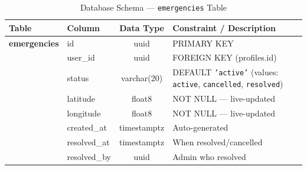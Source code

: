 \documentclass[12pt, a4paper, twoside]{report}
\begin{document}
\begin{table}[ht]
\centering
\caption{Database Schema --- \texttt{emergencies} Table}
\label{tab:emergencies}
\begin{tabularx}{\textwidth}{p{3cm} p{3cm} c X}
\toprule
\textbf{Table} & \textbf{Column} & \textbf{Data Type} & \textbf{Constraint / Description} \\
\midrule
\textbf{emergencies} & id & uuid & PRIMARY KEY \\
& user\_id & uuid & FOREIGN KEY (profiles.id) \\
& status & varchar(20) & DEFAULT \texttt{'active'} (values: \texttt{active}, \texttt{cancelled}, \texttt{resolved}) \\
& latitude & float8 & NOT NULL --- live-updated \\
& longitude & float8 & NOT NULL --- live-updated \\
& created\_at & timestamptz & Auto-generated \\
& resolved\_at & timestamptz & When resolved/cancelled \\
& resolved\_by & uuid & Admin who resolved \\
\bottomrule
\end{tabularx}
\end{table}
\end{document}

